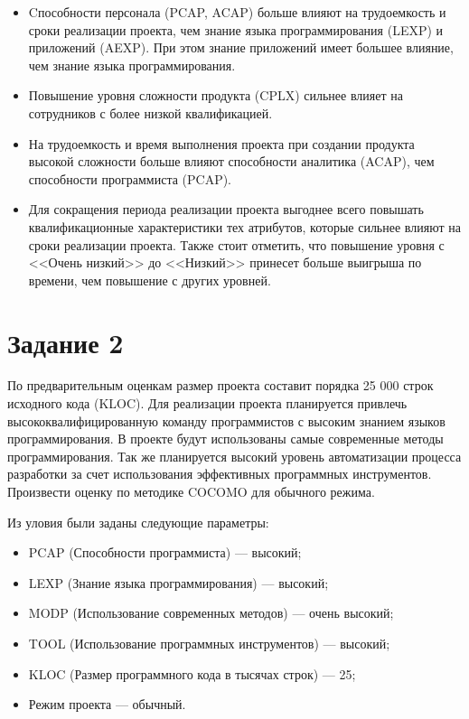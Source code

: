 \documentclass{bmstu}
\begin{document}
\begin{itemize}
    \item Cпособности персонала (PCAP, ACAP) больше влияют на трудоемкость и сроки реализации проекта, чем знание языка программирования (LEXP) и приложений (AEXP). При этом знание приложений имеет большее влияние, чем знание языка программирования.
    \item Повышение уровня сложности продукта (CPLX) сильнее влияет на сотрудников с более низкой квалификацией.
    \item На трудоемкость и время выполнения проекта при создании продукта высокой сложности больше влияют способности аналитика (ACAP), чем способности программиста (PCAP).
    \item Для сокращения периода реализации проекта выгоднее всего повышать квалификационные характеристики тех атрибутов, которые сильнее влияют на сроки реализации проекта. Также стоит отметить, что повышение уровня с <<Очень низкий>> до <<Низкий>> принесет больше выигрыша по времени, чем повышение с других уровней.
\end{itemize}

\clearpage

\section*{Задание 2}

По предварительным оценкам размер проекта составит порядка 25 000 строк исходного кода (KLOC). Для реализации проекта планируется привлечь высококвалифицированную команду программистов с высоким знанием языков программирования. В проекте будут использованы самые современные методы программирования. Так же планируется высокий уровень автоматизации процесса разработки за счет использования эффективных программных инструментов. Произвести оценку по методике COCOMO для обычного режима.

Из уловия были заданы следующие параметры:

\begin{itemize}
    \item PCAP (Способности программиста) --- высокий;
    \item LEXP (Знание языка программирования) --- высокий;
    \item MODP (Использование современных методов) --- очень высокий;
    \item TOOL (Использование программных инструментов) --- высокий;
    \item KLOC (Размер программного кода в тысячах строк) --- 25;
    \item Режим проекта --- обычный.
\end{itemize}
\end{document}
